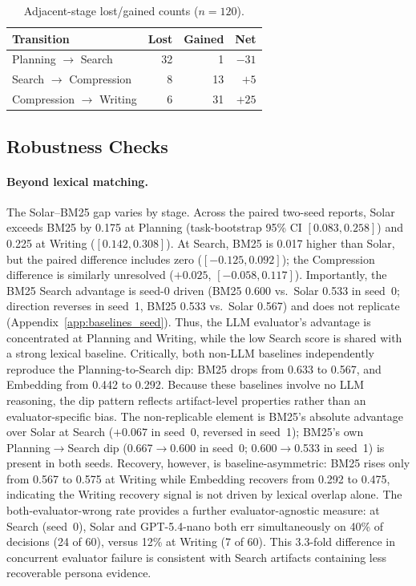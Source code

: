 \documentclass[]{article}
\begin{document}
\begin{table}[t]
\centering
\small
\begin{tabular}{lrrr}
\toprule
\textbf{Transition} & \textbf{Lost} & \textbf{Gained} & \textbf{Net} \\
\midrule
Planning $\rightarrow$ Search     & 32 & 1  & $-31$ \\
Search $\rightarrow$ Compression  & 8  & 13 & $+5$ \\
Compression $\rightarrow$ Writing & 6  & 31 & $+25$ \\
\bottomrule
\end{tabular}
\caption{Adjacent-stage lost/gained counts ($n{=}120$).}
\label{tab:transition_flows}
\end{table}

\subsection{Robustness Checks}

\paragraph{Beyond lexical matching.}
The Solar--BM25 gap varies by stage. Across the paired two-seed reports,
Solar exceeds BM25 by 0.175 at Planning (task-bootstrap 95\% CI
$[0.083,0.258]$) and 0.225 at Writing ($[0.142,0.308]$).
At Search, BM25 is 0.017 higher than Solar, but the paired difference
includes zero ($[-0.125,0.092]$); the Compression difference is similarly
unresolved ($+0.025$, $[-0.058,0.117]$).
Importantly, the BM25 Search advantage is seed-0 driven (BM25 0.600 vs.\
Solar 0.533 in seed~0; direction reverses in seed~1, BM25 0.533 vs.\ Solar
0.567) and does not replicate (Appendix~\ref{app:baselines_seed}).
Thus, the LLM evaluator's advantage is concentrated at Planning and Writing,
while the low Search score is shared with a strong lexical baseline.
Critically, both non-LLM baselines independently reproduce the
Planning-to-Search dip: BM25 drops from 0.633 to 0.567, and Embedding
from 0.442 to 0.292. Because these baselines involve no LLM reasoning,
the dip pattern reflects artifact-level properties rather than an
evaluator-specific bias. The non-replicable element is BM25's absolute
advantage over Solar at Search ($+0.067$ in seed~0, reversed in seed~1);
BM25's own Planning$\to$Search dip (0.667$\to$0.600 in seed~0;
0.600$\to$0.533 in seed~1) is present in both seeds.
Recovery, however, is baseline-asymmetric: BM25 rises only from 0.567 to
0.575 at Writing while Embedding recovers from 0.292 to 0.475, indicating
the Writing recovery signal is not driven by lexical overlap alone.
The both-evaluator-wrong rate provides a further evaluator-agnostic
measure: at Search (seed~0), Solar and GPT-5.4-nano both err
simultaneously on 40\% of decisions (24 of 60), versus 12\% at Writing
(7 of 60). This 3.3-fold difference in concurrent evaluator failure is consistent
with Search artifacts containing less recoverable persona evidence.
\end{document}
